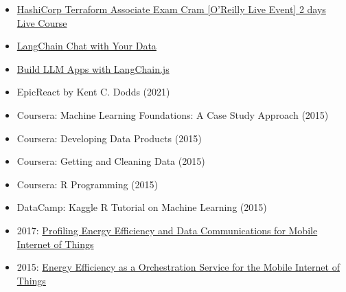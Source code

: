 \begin{minipage}[t]{0.29\textwidth}
{\begin{minipage}[t][293mm][t]{0.82\textwidth}
    \Large
    \Large
    \begin{itemize}
        \item {\href{https://github.com/p10ns11y/oreilly-terraform-live-course-sessions}{\color{sidebarlinkcolor}HashiCorp Terraform Associate Exam Cram [O'Reilly Live Event] 2 days Live Course}}
        \item {\href{https://learn.deeplearning.ai/accomplishments/f72f24f1-9ad2-4bc0-b8c2-33cbecb81ec2}{\color{sidebarlinkcolor}LangChain Chat with Your Data}}
        \item {\href{https://learn.deeplearning.ai/accomplishments/14907d64-9ff2-4dc7-b5f7-ce42982f8551?usp=sharing}{\color{sidebarlinkcolor}Build LLM Apps with LangChain.js}}
    \end{itemize}

    \Large
    \Large
    \begin{itemize}
        \item EpicReact by Kent C. Dodds (2021)
        \item Coursera: Machine Learning Foundations: A Case Study Approach (2015)
        \item Coursera: Developing Data Products (2015)
        \item Coursera: Getting and Cleaning Data (2015)
        \item Coursera: R Programming (2015)
        \item DataCamp: Kaggle R Tutorial on Machine Learning (2015)
    \end{itemize}

    \Large
    \Large
    \begin{itemize}
        \item 2017: {\href{https://onlinelibrary.wiley.com/doi/10.1155/2017/6562915}{\color{sidebarlinkcolor}Profiling Energy Efficiency and Data Communications for Mobile Internet of Things}}
        \item 2015: {\href{https://ieeexplore.ieee.org/abstract/document/7396150}{\color{sidebarlinkcolor}Energy Efficiency as a Orchestration Service for the Mobile Internet of Things}}
    \end{itemize}

    \end{minipage}%
    \textwidth\relax%
}
\end{minipage}%
